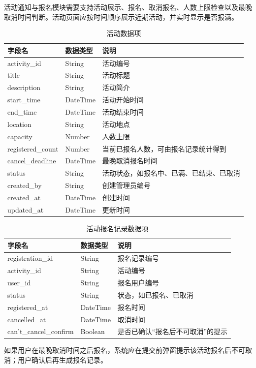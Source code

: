 \documentclass[a4paper,12pt]{article}
\begin{document}
活动通知与报名模块需要支持活动展示、报名、取消报名、人数上限检查以及最晚取消时间判断。活动页面应按时间顺序展示近期活动，并实时显示是否报满。

\begin{longtable}{p{3.5cm}p{3cm}p{7cm}}
\caption{活动数据项} \\
\toprule
字段名 & 数据类型 & 说明 \\
\midrule
activity\_id & String & 活动编号 \\
title & String & 活动标题 \\
description & String & 活动简介 \\
start\_time & DateTime & 活动开始时间 \\
end\_time & DateTime & 活动结束时间 \\
location & String & 活动地点 \\
capacity & Number & 人数上限 \\
registered\_count & Number & 当前已报名人数，可由报名记录统计得到 \\
cancel\_deadline & DateTime & 最晚取消报名时间 \\
status & String & 活动状态，如报名中、已满、已结束、已取消 \\
created\_by & String & 创建管理员编号 \\
created\_at & DateTime & 创建时间 \\
updated\_at & DateTime & 更新时间 \\
\bottomrule
\end{longtable}

\begin{longtable}{p{3.5cm}p{3cm}p{7cm}}
\caption{活动报名记录数据项} \\
\toprule
字段名 & 数据类型 & 说明 \\
\midrule
registration\_id & String & 报名记录编号 \\
activity\_id & String & 活动编号 \\
user\_id & String & 报名用户编号 \\
status & String & 状态，如已报名、已取消 \\
registered\_at & DateTime & 报名时间 \\
cancelled\_at & DateTime & 取消时间 \\
can't\_cancel\_confirm & Boolean & 是否已确认“报名后不可取消”的提示 \\
\bottomrule
\end{longtable}

如果用户在最晚取消时间之后报名，系统应在提交前弹窗提示该活动报名后不可取消；用户确认后再生成报名记录。
\end{document}
